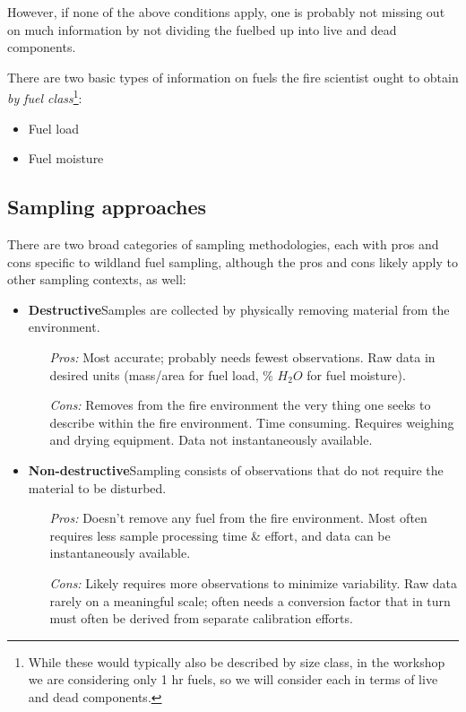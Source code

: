 However, if none of the above conditions apply, one is probably not missing out on much information by not dividing the fuelbed up into live and dead components.

There are two basic types of information on fuels the fire scientist ought to obtain \emph{by fuel class}\footnote{While these would typically also be described by size class, in the workshop we are considering only 1 hr fuels, so we will consider each in terms of live and dead components.}: 

\begin{itemize}[noitemsep]
	\item Fuel load 
	\item Fuel moisture
\end{itemize}

\subsection{Sampling approaches}

There are two broad categories of sampling methodologies, each with pros and cons specific to wildland fuel sampling, although the pros and cons likely apply to other sampling contexts, as well: 
\begin{itemize}
	\item \textbf{Destructive\textemdash}Samples are collected by physically removing material from the environment. 
	\begin{itemize}[noitemsep]
		\item[\textit{Pros:}]Most accurate; probably needs fewest observations. Raw data in desired units (mass/area for fuel load, \% $H_{2}O$ for fuel moisture).
		\item[\textit{Cons:}]Removes from the fire environment the very thing one seeks to describe within the fire environment. 
		Time consuming. 
		Requires weighing and drying equipment.
		Data not instantaneously available. 
	\end{itemize}
	\item \textbf{Non-destructive\textemdash}Sampling consists of observations that do not require the material to be disturbed. 
		\begin{itemize}[noitemsep]
		\item[\textit{Pros:}]Doesn't remove any fuel from the fire environment. Most often requires less sample processing time \& effort, and data can be instantaneously available. 
		\item[\textit{Cons:}]Likely requires more observations to minimize variability. Raw data rarely on a meaningful scale; often needs a conversion factor that in turn must often be derived from separate calibration efforts.
	\end{itemize}
\end{itemize}

